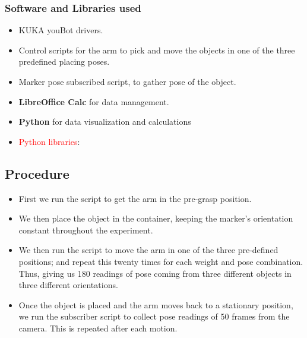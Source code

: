 \documentclass[10pt,a4paper]{article}
\begin{document}
					\subsubsection{Software and Libraries used}
						\begin{itemize}
							\item KUKA youBot drivers.
							\item Control scripts for the arm to pick and move the objects in one of the three predefined placing poses.
							\item Marker pose subscribed script, to gather pose of the object.
							\item \textbf{LibreOffice Calc} for data management.
							\item \textbf{Python} for data visualization and calculations
							\item \textcolor{red}{Python libraries}:
							\end{itemize}		
											
				\subsection{Procedure}	
					\begin{itemize}
						\item First we run the script to get the arm in the pre-grasp position.
						\item We then place the object in the container, keeping the marker's orientation constant throughout the experiment.\\
						\item We then run the script to move the arm in one of the three pre-defined positions; and repeat this twenty times for each weight and pose combination. Thus, giving us 180 readings of pose coming from three different objects in three different orientations.
						\item Once the object is placed and the arm moves back to a stationary position, we run the subscriber script to collect pose readings of 50 frames from the camera. This is repeated after each motion.
					\end{itemize}
\end{document}
